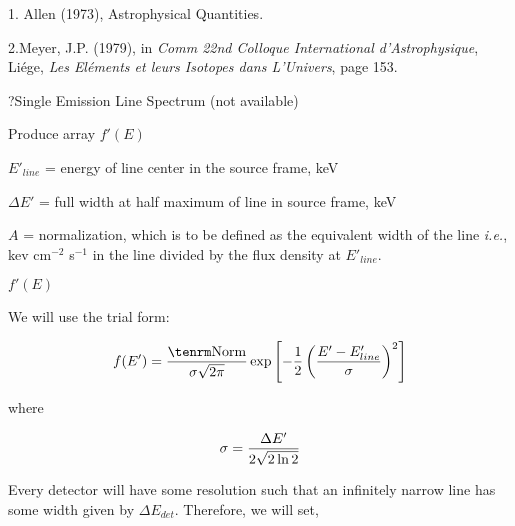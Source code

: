 \centerline{}


\noindent
{}

\item{1.} Allen (1973), Astrophysical Quantities.
 
\item{2.}Meyer, J.P. (1979), in {\it Comm 22nd Colloque International
d'Astrophysique}, Li\'ege, {\it Les El\'ements et leurs Isotopes dans 
L'Univers}, page 153.
\par\vfill\eject
 
\??Single Emission Line Spectrum (not available)

{\listlist
 

Produce array $f'(E)$


$E'_{line}$ = energy of line center in the source frame, keV
 
$\Delta E'$ = full width at half maximum of line in source frame, keV

$A$ =  normalization, which is to be defined as the equivalent
width of the line {\it i.e.}, kev cm$^{-2}$ s$^{-1}$ in the line
divided by the flux density at $E'_{line}$.


$f'(E)$
 

We will use the trial form:

}

$$f(E') = {{\rm Norm}\over \sigma \sqrt{2\pi}} \exp \left[-{1\over 2}
 \left({E'-E'_{line}\over \sigma}\right)^{2}\right]$$

\itemitem{}where

$$\sigma = {\Delta E' \over 2 \sqrt{2 \ln 2}}$$

{\listlist

Every detector will have some resolution such that an infinitely
narrow line
has some width given by $\Delta E_{det}$.  Therefore, we will set,

}

